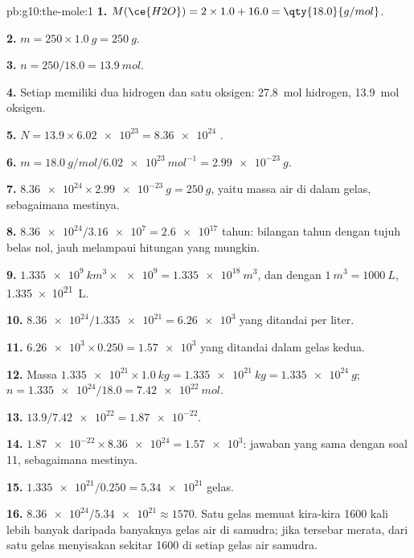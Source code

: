 \begin{solution}{pb:g10:the-mole:1}
\textbf{1.} $M(\ce{H2O}) = 2 \times 1.0 + 16.0 = \qty{18.0}{g/mol}$.

\textbf{2.} $m = 250 \times \qty{1.0}{g} = \qty{250}{g}$.

\textbf{3.} $n = 250 / 18.0 = \qty{13.9}{mol}$.

\textbf{4.} Setiap  memiliki dua  hidrogen dan satu 
oksigen: \qty{27.8}{mol}  hidrogen, \qty{13.9}{mol}  oksigen.

\textbf{5.} $N = 13.9 \times \num{6.02e23} = \num{8.36e24}$ .

\textbf{6.} $m = \qty{18.0}{g/mol} / \qty{6.02e23}{mol^{-1}} =
\qty{2.99e-23}{g}$.

\textbf{7.} $\num{8.36e24} \times \qty{2.99e-23}{g} = \qty{250}{g}$,
yaitu massa air di dalam gelas, sebagaimana mestinya.

\textbf{8.} $\num{8.36e24} / \num{3.16e7} = \num{2.6e17}$ tahun: bilangan
tahun dengan tujuh belas nol, jauh melampaui hitungan yang mungkin.

\textbf{9.} $\qty{1.335e9}{km^3} \times \num{e9} = \qty{1.335e18}{m^3}$,
dan dengan $\qty{1}{m^3} = \qty{1000}{L}$, \qty{1.335e21}{L}.

\textbf{10.} $\num{8.36e24} / \num{1.335e21} = \num{6.26e3}$ 
yang ditandai per liter.

\textbf{11.} $\num{6.26e3} \times 0.250 = \num{1.57e3}$  yang
ditandai dalam gelas kedua.

\textbf{12.} Massa $\num{1.335e21} \times \qty{1.0}{kg} =
\qty{1.335e21}{kg} = \qty{1.335e24}{g}$; $n = \num{1.335e24} / 18.0 =
\qty{7.42e22}{mol}$.

\textbf{13.} $13.9 / \num{7.42e22} = \num{1.87e-22}$.

\textbf{14.} $\num{1.87e-22} \times \num{8.36e24} = \num{1.57e3}$:
jawaban yang sama dengan soal 11, sebagaimana mestinya.

\textbf{15.} $\num{1.335e21} / 0.250 = \num{5.34e21}$ gelas.

\textbf{16.} $\num{8.36e24} / \num{5.34e21} \approx 1570$. Satu gelas
memuat kira-kira 1600 kali lebih banyak  daripada banyaknya gelas
air di samudra; jika tersebar merata,  dari satu gelas
menyisakan sekitar 1600 di setiap gelas air samudra.


\end{solution}
